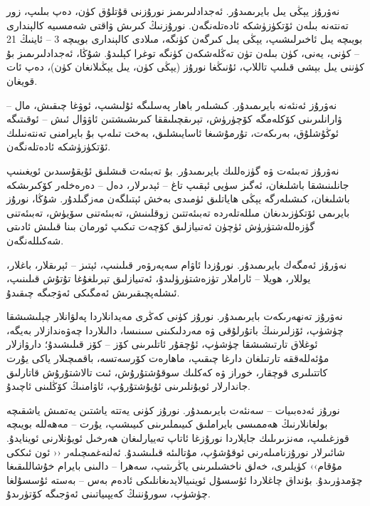 \documentclass[a4paper]{article}
\begin{document}
\begin{flushright}
نەۋرۇز يېڭى يىل بايرىمىدۇر. ئەجدادلىرىمىز نورۇزنى قۇتلۇق كۈن، دەپ بىلىپ، زور تەنتەنە بىلەن ئۆتكۈزۈشكە ئادەتلەنگەن. نورۇزنىڭ كىرىش ۋاقتى شەمسىيە كالېندارى بويىچە يىل ئاخىرلىشىپ، يېڭى يىل كىرگەن كۈنگە، مىلادى كالېندارى بويىچە 3 – ئاينىڭ 21 – كۈنى، يەنى، كۈن بىلەن تۈن تەڭلەشكەن كۈنگە توغرا كېلىدۇ. شۇڭا، ئەجدادلىرىمىز بۇ كۈننى يىل بېشى قىلىپ تاللاپ، ئۇنىڭغا نورۇز (يېڭى كۈن، يىل يېڭىلانغان كۈن)، دەپ ئات قويغان.



نەۋرۇز ئەنئەنە بايرىمىدۇر. كىشىلەر باھار پەسلىگە ئۇلىشىپ، ئوۋغا چىقىش، مال – ۋارانلىرىنى كۆكلەمگە كۆچۈرۈش، تېرىقچىلىققا كىرىشىشتىن ئاۋۋال ئىش – ئوقىتىگە ئوڭۇشلۇق، بەرىكەت، تۇرمۇشىغا ئاسايىشلىق، بەخت تىلەپ بۇ بايرامنى تەنتەنىلىك ئۆتكۈزۈشكە ئادەتلەنگەن.



نەۋرۇز تەبىئەت ۋە گۈزەللىك بايرىمىدۇر. بۇ تەبىئەت قىشلىق ئۇيقۇسىدىن ئويغىنىپ جانلىنىشقا باشلىغان، ئەگىز سۈيى ئېقىپ تاغ – ئېدىرلار، دەل – دەرەخلەر كۆكىرىشكە باشلىغان، كىشىلەرگە يېڭى ھاياتلىق ئۈمىدى بەخش ئېتىلگەن مەزگىلدۇر. شۇڭا، نورۇز بايرىمى ئۆتكۈزىدىغان مىللەتلەردە تەبىئەتتىن زوقلىنىش، تەبىئەتنى سۆيۈش، تەبىئەتنى گۈزەللەشتۈرۈش ئۈچۈن ئەتىيازلىق كۆچەت تىكىپ ئورمان بىنا قىلىش ئادىتى شەكىللەنگەن.



نەۋرۇز ئەمگەك بايرىمىدۇر. نورۇزدا ئاۋام سەپەرۋەر قىلىنىپ، ئېتىز – ئېرىقلار، باغلار، يوللار، ھويلا – ئاراملار تۈزەشتۈرۈلىدۇ، ئەتىيازلىق تېرىلغۇغا تۇتۇش قىلىنىپ، ئىشلەپچىقىرىش ئەمگىكى ئەۋجىگە چىقىدۇ.



نەۋرۇز تەنھەرىكەت بايرىمىدۇر. نورۇز كۈنى كەڭرى مەيدانلاردا پەلۋانلار چېلىشىشقا چۈشۈپ، ئۆزلىرىنىڭ باتۇرلۇقى ۋە مەردلىكىنى سىنىسا، دالىلاردا چەۋەندازلار بەيگە، ئوغلاق تارتىشىشقا چۈشۈپ، ئۇچقۇر ئاتلىرىنى كۆز – كۆز قىلىشىدۇ؛ دارۋازلار مۇئەللەققە تارتىلغان دارغا چىقىپ، ماھارەت كۆرسەتسە، باقمىچىلار ياكى يۇرت كاتتىلىرى قوچقار، خوراز ۋە كەكلىك سوقۇشتۇرۇش، ئىت تالاشتۇرۇش قاتارلىق جاندارلار ئويۇنلىرىنى ئۇيۇشتۇرۇپ، ئاۋامنىڭ كۆڭلىنى ئاچىدۇ.



نورۇز ئەدەبىيات – سەنئەت بايرىمىدۇر. نورۇز كۈنى يەتتە ياشتىن يەتمىش ياشقىچە بولغانلارنىڭ ھەممىسى بايراملىق كىيىملىرىنى كىيىشىپ، يۇرت – مەھەللە بويىچە قوزغىلىپ، مەنزىرىلىك جايلاردا نورۇزغا ئاتاپ تەييارلىغان ھەرخىل ئويۇنلارنى ئوينايدۇ. شائىرلار نورۇزنامىلەرنى ئوقۇشۇپ، مۇتالىئە قىلىشىدۇ. ئەلنەغمىچىلەر ‹‹ ئون ئىككى مۇقام›› كۈيلىرى، خەلق ناخشىلىرىنى ياڭرىتىپ، سەھرا – دالىنى بايرام خۇشاللىقىغا چۆمدۈرىدۇ. بۇنداق چاغلاردا ئۇسسۇل ئوينىيالايدىغانلىكى ئادەم بەس – بەستە ئۇسسۇلغا چۈشۈپ، سورۇننىڭ كەيپىياتىنى ئەۋجىگە كۆتۈرىدۇ.




\end{flushright}
\end{document}
